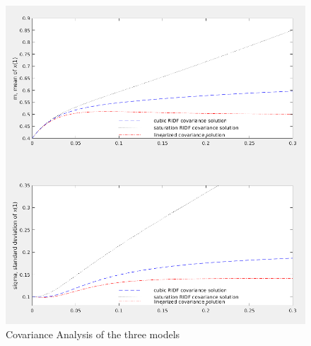 \documentclass[12pt,letterpaper]{article}
\begin{document}
\begin{figure}[!h] 
    \centering
    \includegraphics[width=\textwidth]{../matlab/img/simu2.png}
    \caption{Covariance Analysis of the three models}
    \label{fig:simu}
    \end{figure}
  
\end{document}
